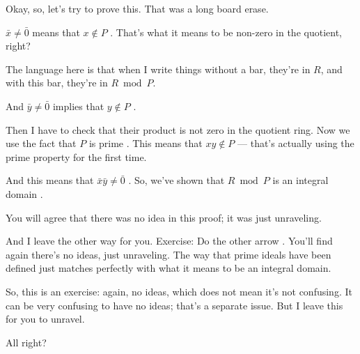 \begin{speech}[01:00:16 - 01:01:22]
Okay, so, let's try to prove this. That was a long board erase.

$\bar{x} \neq \bar{0}$ means that $x \notin P$ . That's what it means to be non-zero in the quotient, right?

The language here is that when I write things without a bar, they're in $R$, and with this bar, they're in $R \bmod P$.

And $\bar{y} \neq \bar{0}$ implies that $y \notin P$ .

Then I have to check that their product is not zero in the quotient ring. Now we use the fact that $P$ is prime . This means that $xy \notin P$  --- that's actually using the prime property for the first time.

And this means that $\bar{x}\bar{y} \neq \bar{0}$ . So, we've shown that $R \bmod P$ is an integral domain .

You will agree that there was no idea in this proof; it was just unraveling.
\end{speech}

\begin{speech}[01:01:22 - 01:02:08]
And I leave the other way for you. Exercise: Do the other arrow . You'll find again there's no ideas, just unraveling. The way that prime ideals have been defined just matches perfectly with what it means to be an integral domain.

So, this is an exercise: again, no ideas, which does not mean it's not confusing. It can be very confusing to have no ideas; that's a separate issue.  But I leave this for you to unravel.

All right?
\end{speech}

